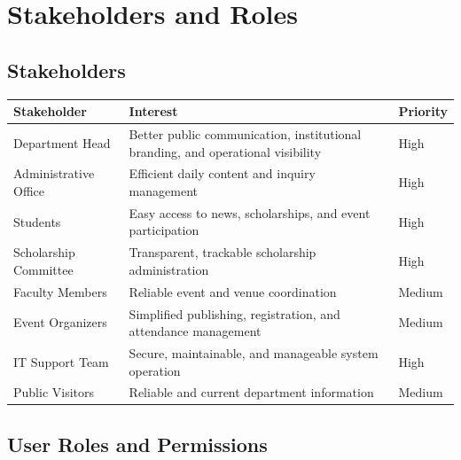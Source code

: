 \documentclass[12pt,a4paper]{article}
\newcommand{\thead}[1]{\textbf{\color{white}#1}}
\newcommand{\theadrow}{\rowcolor{headerblue}}
\begin{document}
\section{Stakeholders and Roles}

\subsection{Stakeholders}

\begin{longtable}{@{}L{4cm}L{7cm}C{2cm}@{}}
\theadrow \thead{Stakeholder} & \thead{Interest} & \thead{Priority} \\
\endhead
Department Head & Better public communication, institutional branding, and operational visibility & High \\
Administrative Office & Efficient daily content and inquiry management & High \\
Students & Easy access to news, scholarships, and event participation & High \\
Scholarship Committee & Transparent, trackable scholarship administration & High \\
Faculty Members & Reliable event and venue coordination & Medium \\
Event Organizers & Simplified publishing, registration, and attendance management & Medium \\
IT Support Team & Secure, maintainable, and manageable system operation & High \\
Public Visitors & Reliable and current department information & Medium \\
\bottomrule
\end{longtable}

\subsection{User Roles and Permissions}
\end{document}
